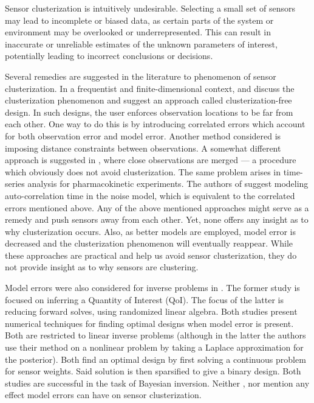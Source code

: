 Sensor clusterization is intuitively undesirable. Selecting a small
set of sensors may lead to incomplete or biased data, as certain parts
of the system or environment may be overlooked or
underrepresented. This can result in inaccurate or unreliable
estimates of the unknown parameters of interest, potentially leading
to incorrect conclusions or decisions.

Several remedies are suggested in the literature to phenomenon of
sensor clusterization. In a frequentist and finite-dimensional
context, \cite{fedorov1996} and \cite[chapter 2.4.3]{Ucinski05}
discuss the clusterization phenomenon and suggest an approach called
clusterization-free design. In such designs, the user enforces
observation locations to be far from each other. One way to do this is
by introducing correlated errors which account for both observation
error and model error. Another method considered is imposing distance
constraints between observations. A somewhat different approach is
suggested in \cite[page 49]{fedorov2012}, where close observations are
merged --- a procedure which obviously does not avoid
clusterization. The same problem arises in time-series analysis for
pharmacokinetic experiments. The authors of \cite{hooker2009} suggest
modeling auto-correlation time in the noise model, which is equivalent
to the correlated errors mentioned above. Any of the above mentioned
approaches might serve as a remedy and push sensors away from each
other. Yet, none offers any insight as to why clusterization
occurs. Also, as better models are employed, model error is decreased
and the clusterization phenomenon will eventually reappear. While
these approaches are practical and help us avoid sensor
clusterization, they do not provide insight as to why sensors are
clustering.

Model errors were also considered for inverse problems in
\cite{attia2020, koval2020}. The former study is focused on inferring
a Quantity of Interest (QoI). The focus of the latter is reducing
forward solves, using randomized linear algebra. Both studies present
numerical techniques for finding optimal designs when model error is
present. Both are restricted to linear inverse problems (although in
the latter the authors use their method on a nonlinear problem by
taking a Laplace approximation for the posterior). Both find an
optimal design by first solving a continuous problem for sensor
weights. Said solution is then sparsified to give a binary
design. Both studies are successful in the task of Bayesian
inversion. Neither \cite{attia2020}, nor \cite{koval2020} mention any
effect model errors can have on sensor clusterization.


